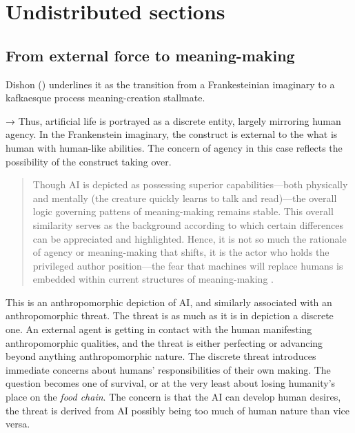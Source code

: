 \chapter{Undistributed sections}\label{chap:Undistributed sections} %

\section{From external force to meaning-making}\label{sec:From external force to meaning-making} %

Dishon (\citeyear{dishon2024}) underlines it as the transition from a Frankesteinian
imaginary to a kafkaesque process meaning-creation stallmate.

→ Thus, artificial life is portrayed as a discrete entity, largely mirroring
human agency. In the Frankenstein imaginary, the construct is external to the
what is human with human-like abilities. The concern of agency in this case
reflects the possibility of the construct taking over.

\begin{quote}
	Though AI is depicted as possessing superior capabilities—both physically and mentally (the creature quickly learns to talk and read)—the overall logic governing pattens of meaning-making remains stable. This overall similarity serves as the background according to which certain differences can be appreciated and highlighted. Hence, it is not so much the rationale of agency or meaning-making that shifts, it is the actor who holds the privileged author position—the fear that machines will replace humans is embedded within current structures of meaning-making \parencite[966]{dishon2024} .
\end{quote}

This is an anthropomorphic depiction of AI, and similarly associated with an
anthropomorphic threat. The threat is as much as it is in depiction a discrete
one. An external agent is getting in contact with the human manifesting
anthropomorphic qualities, and the threat is either perfecting or advancing beyond
anything anthropomorphic nature. The discrete threat introduces immediate
concerns about humans' responsibilities of their own making. The question
becomes one of survival, or at the very least about losing humanity's place on
the \emph{food chain}. The concern is that the AI can develop human desires,
the threat is derived from AI possibly being too much of human nature than vice
versa.

